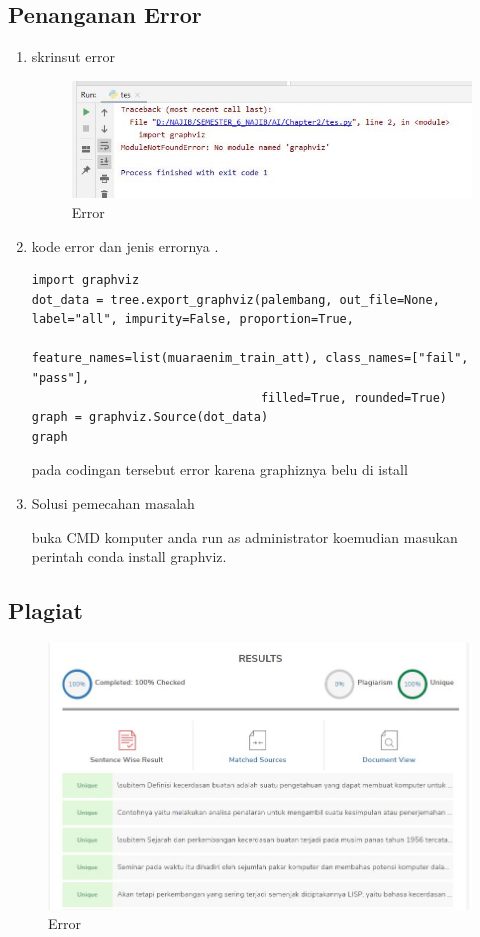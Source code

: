 \subsection{Penanganan Error}
\begin{enumerate}
\item skrinsut error
\begin{figure}[ht]
\centering
\includegraphics[scale=0.5]{figures/1174042/chapter2/error.JPG}
\caption{Error}
\label{contoh}
\end{figure}

\item kode error dan jenis errornya .
\begin{verbatim}
import graphviz
dot_data = tree.export_graphviz(palembang, out_file=None, label="all", impurity=False, proportion=True,
                                feature_names=list(muaraenim_train_att), class_names=["fail", "pass"], 
                                filled=True, rounded=True)
graph = graphviz.Source(dot_data)
graph
\end{verbatim}

pada codingan tersebut error karena graphiznya belu di istall 

\item Solusi pemecahan masalah \par
buka CMD komputer anda run as administrator koemudian masukan perintah conda install graphviz.
\end{enumerate}


\subsection{Plagiat}
\begin{figure}[ht]
\centering
\includegraphics[scale=0.5]{figures/1174042/chapter2/plagiat.jpg}
\caption{Error}
\label{contoh}
\end{figure}
